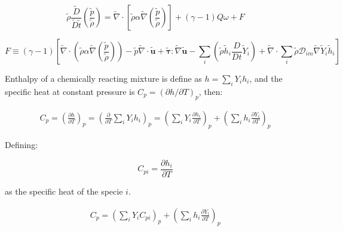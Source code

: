\documentclass[preprint,12pt,authoryear]{elsarticle}
\begin{document}
\begin{equation}
         \tilde{\rho}  
         \frac{\tilde{D} } {\tilde{D}\tilde{t} }
         (\frac{ \tilde{p}}{ \tilde{\rho}})
        = 
		\tilde{\nabla} \cdot 
			\left[ \tilde{\rho} \alpha
		\tilde{\nabla} (\frac{ \tilde{p} }{  \tilde{\rho} } )\right]
                +
        (\gamma - 1) Q \omega
        +
        F
\label{eqp}
\end{equation}

\begin{equation}
    F \equiv 
            (\gamma - 1)
        \left[
        \tilde{\nabla} \cdot 
		\left( 
		\tilde{\rho} \alpha
		\tilde{\nabla} (\frac{ \tilde{p} }{  \tilde{\rho} } )
		\right)
        -
        \tilde{p}  \tilde{\nabla} \cdot \tilde{\mathbf{u}}
		 +
        \pmb{\tilde{\tau}}:\tilde{\nabla} \tilde{\mathbf{u}} 
        -
        \sum\limits_i
        \left(
                 \tilde{\rho}\tilde{h}_i
                \frac{D}{Dt}
		\tilde{Y}_i
		\right)
        +
        \tilde{\nabla} \cdot
        \sum\limits_i 
        \tilde{\rho}\mathcal{D}_{im}\tilde{\nabla}\tilde{Y}_i     
        \tilde{h}_i
        \right]
\label{eqF}
\end{equation}

Enthalpy of a chemically reacting mixture  
is define as $h=\sum_iY_ih_i$, and 
the specific heat  at constant pressure is 
$C_p=\left(\partial{h}/\partial{T}\right)_p$,
then:

\begin{equation}
\begin{split}
C_p
=
\left(\frac{\partial{h}}{\partial{T}}\right)_p
=
\left(\frac{\partial}{\partial{T}}\sum_i Y_ih_i\right)_p
=
\left(\sum_i Y_i\frac{\partial{h_i}}{\partial{T}}\right)_p
+
\left(\sum_i h_i\frac{\partial{Y_i}}{\partial{T}}\right)_p
\end{split}
\end{equation}

Defining: 

\begin{equation}
C_{pi}=\frac{\partial{h_i}}{\partial{T}}
\end{equation}

as the specific heat of the specie $i$.

\begin{equation}
\begin{split}
C_p
=
\left(\sum_i Y_iC_{pi}\right)_p
+
\left(\sum_i h_i\frac{\partial{Y_i}}{\partial{T}}\right)_p
\end{split}
\end{equation}
\end{document}
